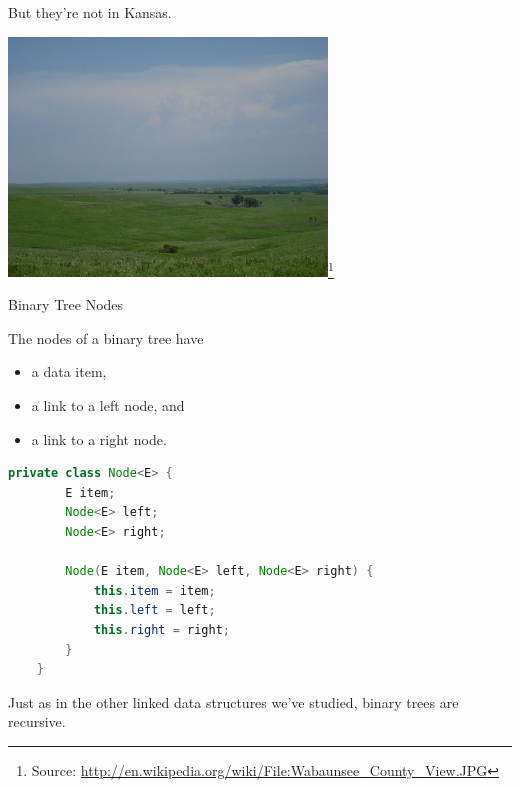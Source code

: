 \documentclass{beamer}
\begin{document}
\begin{frame}[fragile]{}

But they're not in Kansas.

\begin{center}
\includegraphics[height=2.5in]{1024px-Wabaunsee_County_View.JPG}\footnote{Source: \url{http://en.wikipedia.org/wiki/File:Wabaunsee_County_View.JPG}}
\end{center}

\end{frame}


\begin{frame}[fragile]{Binary Tree Nodes}


The nodes of a binary tree have
\begin{itemize}
\item a data item,
\item a link to a left node, and
\item a link to a right node.
\end{itemize}

\begin{lstlisting}[language=Java]
    private class Node<E> {
        E item;
        Node<E> left;
        Node<E> right;

        Node(E item, Node<E> left, Node<E> right) {
            this.item = item;
            this.left = left;
            this.right = right;
        }
    }
\end{lstlisting}

Just as in the other linked data structures we've studied, binary trees are recursive.


\end{frame}
\end{document}
